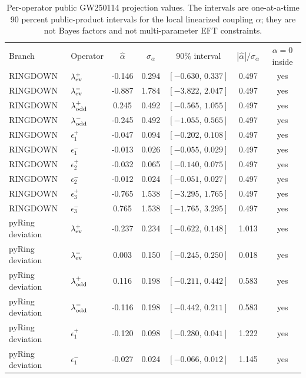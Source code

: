 \documentclass[aps,prd,10pt,twocolumn,nofootinbib,superscriptaddress]{revtex4-2}
\begin{document}
\begin{table}
\caption{Per-operator public GW250114 projection values. The intervals are one-at-a-time 90 percent public-product intervals for the local linearized coupling $\alpha$; they are not Bayes factors and not multi-parameter EFT constraints.}
\label{tab:public_projection_detail}
\begin{ruledtabular}
\begin{tabular}{llccccc}
Branch & Operator & $\hat{\alpha}$ & $\sigma_{\alpha}$ & 90\% interval & $|\hat{\alpha}|/\sigma_{\alpha}$ & $\alpha=0$ inside \\
RINGDOWN & $\lambda_{\rm ev}^{+}$ & -0.146 & 0.294 & $[-0.630,\,0.337]$ & 0.497 & yes \\
RINGDOWN & $\lambda_{\rm ev}^{-}$ & -0.887 & 1.784 & $[-3.822,\,2.047]$ & 0.497 & yes \\
RINGDOWN & $\lambda_{\rm odd}^{+}$ & 0.245 & 0.492 & $[-0.565,\,1.055]$ & 0.497 & yes \\
RINGDOWN & $\lambda_{\rm odd}^{-}$ & -0.245 & 0.492 & $[-1.055,\,0.565]$ & 0.497 & yes \\
RINGDOWN & $\epsilon_1^{+}$ & -0.047 & 0.094 & $[-0.202,\,0.108]$ & 0.497 & yes \\
RINGDOWN & $\epsilon_1^{-}$ & -0.013 & 0.026 & $[-0.055,\,0.029]$ & 0.497 & yes \\
RINGDOWN & $\epsilon_2^{+}$ & -0.032 & 0.065 & $[-0.140,\,0.075]$ & 0.497 & yes \\
RINGDOWN & $\epsilon_2^{-}$ & -0.012 & 0.024 & $[-0.051,\,0.027]$ & 0.497 & yes \\
RINGDOWN & $\epsilon_3^{+}$ & -0.765 & 1.538 & $[-3.295,\,1.765]$ & 0.497 & yes \\
RINGDOWN & $\epsilon_3^{-}$ & 0.765 & 1.538 & $[-1.765,\,3.295]$ & 0.497 & yes \\
pyRing deviation & $\lambda_{\rm ev}^{+}$ & -0.237 & 0.234 & $[-0.622,\,0.148]$ & 1.013 & yes \\
pyRing deviation & $\lambda_{\rm ev}^{-}$ & 0.003 & 0.150 & $[-0.245,\,0.250]$ & 0.018 & yes \\
pyRing deviation & $\lambda_{\rm odd}^{+}$ & 0.116 & 0.198 & $[-0.211,\,0.442]$ & 0.583 & yes \\
pyRing deviation & $\lambda_{\rm odd}^{-}$ & -0.116 & 0.198 & $[-0.442,\,0.211]$ & 0.583 & yes \\
pyRing deviation & $\epsilon_1^{+}$ & -0.120 & 0.098 & $[-0.280,\,0.041]$ & 1.222 & yes \\
pyRing deviation & $\epsilon_1^{-}$ & -0.027 & 0.024 & $[-0.066,\,0.012]$ & 1.145 & yes \\

\end{tabular}
\end{ruledtabular}
\end{table}
\end{document}
